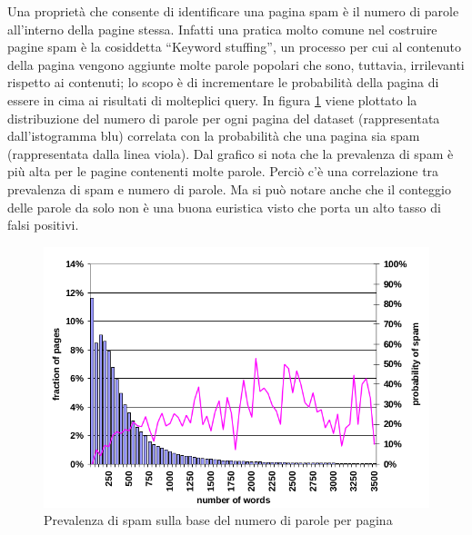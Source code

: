 Una proprietà che consente di identificare una pagina spam è il numero di parole all'interno della pagine stessa. Infatti una pratica molto comune nel costruire pagine spam è la cosiddetta ``Keyword stuffing'', un processo per cui al contenuto della pagina vengono aggiunte molte parole popolari che sono, tuttavia, irrilevanti  rispetto ai contenuti; lo scopo è di incrementare le probabilità della pagina di essere in cima ai risultati di molteplici query. In figura \ref{fig:fetterly3} viene plottato la distribuzione del numero di parole per ogni pagina del dataset (rappresentata dall'istogramma blu) correlata con la probabilità che una pagina sia spam (rappresentata dalla linea viola). Dal grafico si nota che la prevalenza di spam è più alta per le pagine contenenti molte parole. Perciò c'è una correlazione tra prevalenza di spam e numero di parole. Ma si può notare anche che il conteggio delle parole da solo non è una buona euristica visto che porta un alto tasso di falsi positivi.
\begin{figure}[htbp]
\centering
\includegraphics[width=12cm]{immagini/fetterly/fetterly3}
\caption{Prevalenza di spam sulla base del numero di parole per pagina}
\label{fig:fetterly3}
\end{figure}

